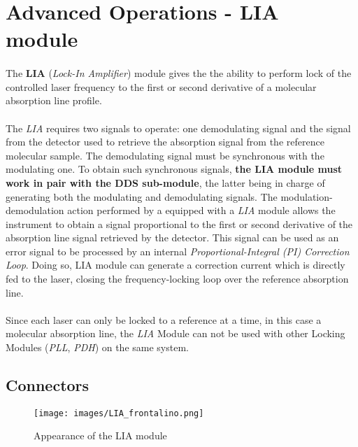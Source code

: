 \section{Advanced Operations - LIA module}   \label{LIA_main_chapter}
\paragraph{} The \textbf{LIA} (\textit{Lock-In Amplifier}) module gives the \QubeModel  the ability to perform lock of the controlled laser frequency to the first or second derivative of a molecular absorption line profile. 
\paragraph{} The \textit{LIA} requires two signals to operate: one demodulating signal and the signal from the detector used to retrieve the absorption signal from the reference molecular sample. The demodulating signal must be synchronous with the modulating one. To obtain such synchronous signals, \textbf{the LIA module must work in pair with the DDS sub-module}, the latter being in charge of generating both the modulating and demodulating signals.
\newline The modulation-demodulation action performed by a \QubeModel  equipped with a \textit{LIA} module allows the instrument to obtain a signal proportional to the first or second derivative of the absorption line signal retrieved by the detector. This signal can be used as an error signal to be processed by an internal \textit{Proportional-Integral (PI) Correction Loop}. Doing so, LIA module can generate a correction current which is directly fed to the laser, closing the frequency-locking loop over the reference absorption line.

\paragraph{} Since each laser can only be locked to a reference at a time, in this case a molecular absorption line, the \textit{LIA} Module can not be used with other Locking Modules (\textit{PLL}, \textit{PDH}) on the same \QubeModel  system.





\subsection{Connectors} \label{LIA_connectors_chapter}
\begin{figure}[h]
    \centering
    \texttt{[image: images/LIA\_frontalino.png]}
    \caption{Appearance of the LIA module}
    \label{LIA_frontalino}
\end{figure}

